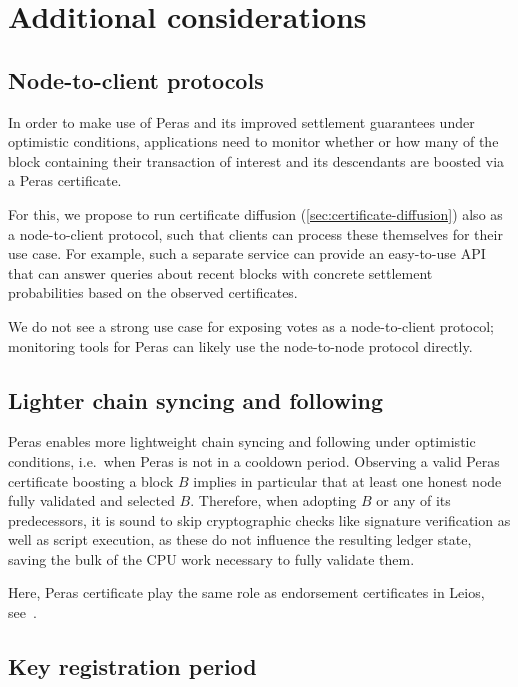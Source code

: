\section{Additional considerations}

\subsection{Node-to-client protocols}

In order to make use of Peras and its improved settlement guarantees under optimistic conditions, applications need to monitor whether or how many of the block containing their transaction of interest and its descendants are boosted via a Peras certificate.

For this, we propose to run certificate diffusion (\cref{sec:certificate-diffusion}) also as a node-to-client protocol, such that clients can process these themselves for their use case.
For example, such a separate service can provide an easy-to-use API that can answer queries about recent blocks with concrete settlement probabilities based on the observed certificates.

We do not see a strong use case for exposing votes as a node-to-client protocol; monitoring tools for Peras can likely use the node-to-node protocol directly.

\subsection{Lighter chain syncing and following}

Peras enables more lightweight chain syncing and following under optimistic conditions, i.e.\ when Peras is not in a cooldown period.
Observing a valid Peras certificate boosting a block $B$ implies in particular that at least one honest node fully validated and selected $B$.
Therefore, when adopting $B$ or any of its predecessors, it is sound to skip cryptographic checks like signature verification as well as script execution, as these do not influence the resulting ledger state, saving the bulk of the CPU work necessary to fully validate them.

Here, Peras certificate play the same role as endorsement certificates in Leios, see~\cite[Section 4.4.2]{leios-design-goals-concepts}.

\subsection{Key registration period}

